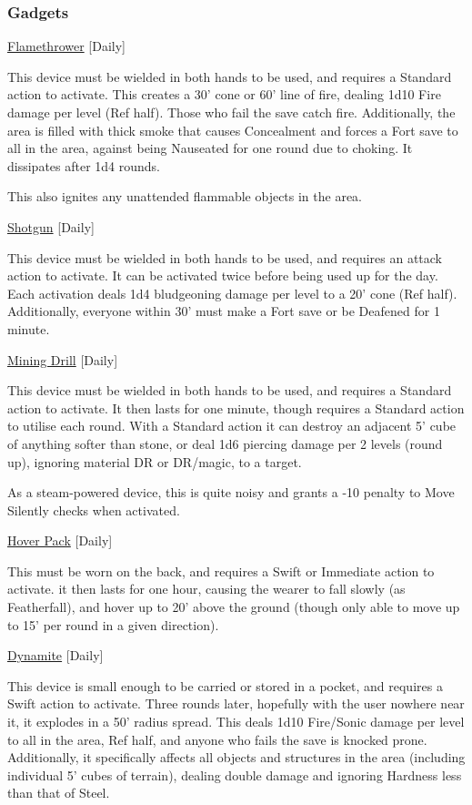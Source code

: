 \subsubsection{Gadgets}

\noindent\underline{Flamethrower} [Daily]
 
\noindent This device must be wielded in both hands to be used, and requires a Standard action to activate. This creates a 30' cone or 60' line of fire, dealing 1d10 Fire damage per level (Ref half). Those who fail the save catch fire. Additionally, the area is filled with thick smoke that causes Concealment and forces a Fort save to all in the area, against being Nauseated for one round due to choking. It dissipates after 1d4 rounds. 

\smallskip\noindent This also ignites any unattended flammable objects in the area. 

\medskip\noindent\underline{Shotgun} [Daily] 

\noindent This device must be wielded in both hands to be used, and requires an attack action to activate. It can be activated twice before being used up for the day. Each activation deals 1d4 bludgeoning damage per level to a 20' cone (Ref half). Additionally, everyone within 30' must make a Fort save or be Deafened for 1 minute. 

\medskip\noindent\underline{Mining Drill} [Daily] 

\noindent This device must be wielded in both hands to be used, and requires a Standard action to activate. It then lasts for one minute, though requires a Standard action to utilise each round. With a Standard action it can destroy an adjacent 5' cube of anything softer than stone, or deal 1d6 piercing damage per 2 levels (round up), ignoring material DR or DR/magic, to a target. 

\smallskip\noindent As a steam-powered device, this is quite noisy and grants a -10 penalty to Move Silently checks when activated. 

\medskip\noindent\underline{Hover Pack} [Daily] 

\noindent This must be worn on the back, and requires a Swift or Immediate action to activate. it then lasts for one hour, causing the wearer to fall slowly (as Featherfall), and hover up to 20' above the ground (though only able to move up to 15' per round in a given direction). 

\medskip\noindent\underline{Dynamite} [Daily] 

\noindent This device is small enough to be carried or stored in a pocket, and requires a Swift action to activate. Three rounds later, hopefully with the user nowhere near it, it explodes in a 50' radius spread. This deals 1d10 Fire/Sonic damage per level to all in the area, Ref half, and anyone who fails the save is knocked prone. Additionally, it specifically affects all objects and structures in the area (including individual 5' cubes of terrain), dealing double damage and ignoring Hardness less than that of Steel. 


